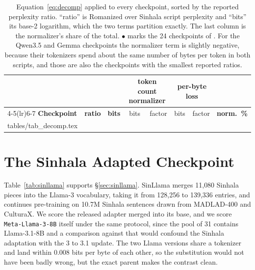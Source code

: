 \documentclass[11pt]{article}
\makeatletter
\newcommand{\rows}[1]{\@@input #1 }
\makeatother
\begin{document}
\begin{table}[t]
\centering\scriptsize
\setlength{\tabcolsep}{5pt}
\begin{tabular}{@{}lr r rr rr r@{}}
\toprule
& & & \multicolumn{2}{c}{\textbf{token count normalizer}}
& \multicolumn{2}{c}{\textbf{per-byte loss}} & \\
\cmidrule(lr){4-5}\cmidrule(lr){6-7}
\textbf{Checkpoint} & \textbf{ratio} & \textbf{bits} & bits & factor & bits & factor
& \textbf{norm.\ \%} \\
\midrule
\rows{tables/tab_decomp.tex}
\bottomrule
\end{tabular}
\caption{Equation~\ref{eq:decomp} applied to every checkpoint, sorted by the
reported perplexity ratio. ``ratio'' is Romanized over Sinhala script perplexity
and ``bits'' its base-2 logarithm, which the two terms partition exactly. The
last column is the normalizer's share of the total. $\bullet$ marks the 24
checkpoints of \citet{rajapakse-weerasinghe-2026-script}. For the Qwen3.5 and Gemma checkpoints the
normalizer term is slightly negative, because their tokenizers spend about the
same number of bytes per token in both scripts, and those are also the
checkpoints with the smallest reported ratios.}
\label{tab:decomp}
\end{table}

\section{The Sinhala Adapted Checkpoint}
\label{sec:sinllamadetail}

Table~\ref{tab:sinllama} supports \S\ref{sec:sinllama}. SinLlama
\citep{aravinda2025sinllama} merges 11{,}080 Sinhala pieces into the Llama-3 vocabulary,
taking it from 128{,}256 to 139{,}336 entries, and continues pre-training on 10.7M
Sinhala sentences drawn from MADLAD-400 and CulturaX. We score the released adapter
merged into its base, and we score \texttt{Meta-Llama-3-8B} itself under the same
protocol, since the pool of 31 contains Llama-3.1-8B and a comparison against that would
confound the Sinhala adaptation with the 3 to 3.1 update. The two Llama versions share a
tokenizer and land within 0.008 bits per byte of each other, so the substitution would
not have been badly wrong, but the exact parent makes the contrast clean.
\end{document}
